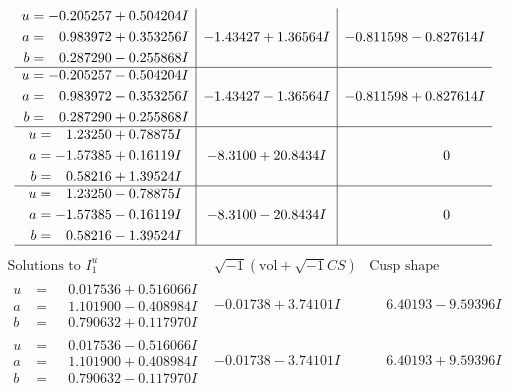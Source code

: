 \documentclass[1p]{elsarticle_modified}
\theoremstyle{definition}
\newcommand{\I}{\sqrt{-1}}
\begin{document}
$$\begin{array}{c|c|c}
\begin{aligned}
u &= -0.205257 + 0.504204 I \\
a &= \phantom{-}0.983972 + 0.353256 I \\
b &= \phantom{-}0.287290 - 0.255868 I\end{aligned}
 & -1.43427 + 1.36564 I & -0.811598 - 0.827614 I \\ \hline\begin{aligned}
u &= -0.205257 - 0.504204 I \\
a &= \phantom{-}0.983972 - 0.353256 I \\
b &= \phantom{-}0.287290 + 0.255868 I\end{aligned}
 & -1.43427 - 1.36564 I & -0.811598 + 0.827614 I \\ \hline\begin{aligned}
u &= \phantom{-}1.23250 + 0.78875 I \\
a &= -1.57385 + 0.16119 I \\
b &= \phantom{-}0.58216 + 1.39524 I\end{aligned}
 & -8.3100 + 20.8434 I & \phantom{-0.000000 } 0 \\ \hline\begin{aligned}
u &= \phantom{-}1.23250 - 0.78875 I \\
a &= -1.57385 - 0.16119 I \\
b &= \phantom{-}0.58216 - 1.39524 I\end{aligned}
 & -8.3100 - 20.8434 I & \phantom{-0.000000 } 0\\
 \hline 
 \end{array}$$\newpage$$\begin{array}{c|c|c}  
\text{Solutions to }I^u_{1}& \I (\text{vol} + \sqrt{-1}CS) & \text{Cusp shape}\\
 \hline 
\begin{aligned}
u &= \phantom{-}0.017536 + 0.516066 I \\
a &= \phantom{-}1.101900 - 0.408984 I \\
b &= \phantom{-}0.790632 + 0.117970 I\end{aligned}
 & -0.01738 + 3.74101 I & \phantom{-}6.40193 - 9.59396 I \\ \hline\begin{aligned}
u &= \phantom{-}0.017536 - 0.516066 I \\
a &= \phantom{-}1.101900 + 0.408984 I \\
b &= \phantom{-}0.790632 - 0.117970 I\end{aligned}
 & -0.01738 - 3.74101 I & \phantom{-}6.40193 + 9.59396 I \\ \hline\begin{aligned}

\end{aligned}
\end{array}$$
\end{document}
